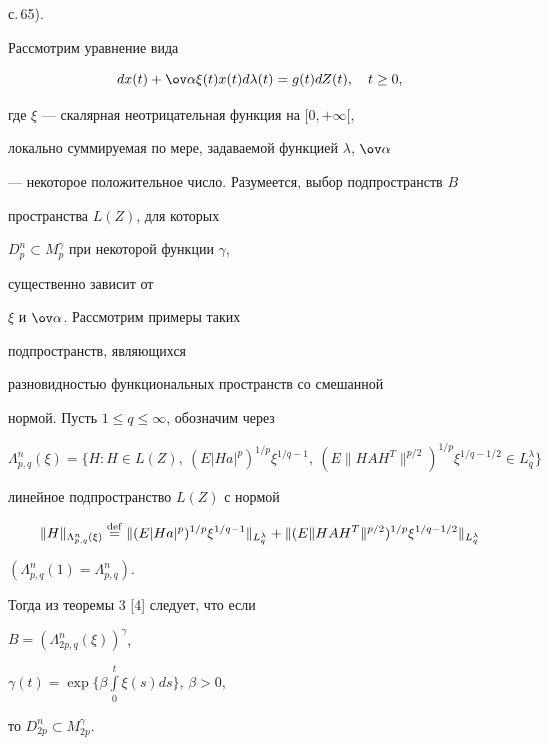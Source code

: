 с.\,65).





Рассмотрим уравнение вида


\begin{equation}


dx(t) + \ov \alpha \xi (t)x(t)d\lambda (t) = g(t)dZ(t),\quad t \ge 0,


\end{equation}


где $\xi $ --- скалярная неотрицательная функция на $[0, +\infty[$,


локально суммируемая по мере, задаваемой функцией $\lambda $, $\ov \alpha$


--- некоторое положительное число. Разумеется, выбор подпространств $B$


пространства $L(Z)$, для которых


$D_p^n \subset M_p^\gamma$ при некоторой функции $\gamma$,


существенно зависит от


$\xi$ и $\ov \alpha$. Рассмотрим примеры таких


подпространств, являющихся


разновидностью функциональных пространств со смешанной


нормой. Пусть $1 \le q \le \infty$, обозначим через


$$


\Lambda _{p,q}^n(\xi )=\{H: H \in L(Z),\ (E|Ha|^p)^{1/p}\xi ^{1/q-1},


\ (E\|HAH^T\|^{p/2})^{1/p}\xi ^{1/q-1/2} \in L_q^\lambda \}


$$


линейное подпространство $L(Z)$ с нормой


$$


\|H\|_{\Lambda^n_{p,q}(\xi)}\Def


\|(E|Ha|^p)^{1/p}\xi ^{1/q-1}\|_{L_q^\lambda} +


\|(E\|HAH^T\|^{p/2})^{1/p}\xi ^{1/q-1/2}\|_{L_q^\lambda }


$$


$(\Lambda _{p,q}^n(1) = \Lambda _{p,q}^n)$.


Тогда из теоремы 3 [4] следует, что если


$B = {(\Lambda _{2p,q}^n(\xi ))}^\gamma$,


$\gamma (t) = \exp\big\{\beta \int \limits _0^t\xi (s)ds\big\}$, $\beta>0$,


то $D_{2p}^n \subset M_{2p}^\gamma$.





